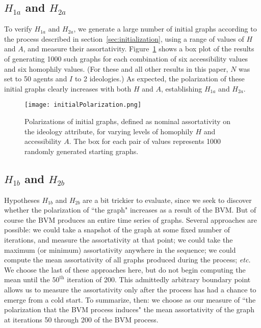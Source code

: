
\subsection{$H_{1a}$ and $H_{2a}$}

To verify $H_{1a}$ and $H_{2a}$, we generate a large number of initial graphs
according to the process described in section~\ref{sec:initialization}, using
a range of values of $H$ and $A$, and measure their assortativity.
Figure~\ref{fig:initialPolarization} shows a box plot of the results of
generating 1000 such graphs for each combination of six accessibility values
and six homophily values. (For these and all other results in this paper, $N$
was set to 50 agents and $I$ to 2 ideologies.) As expected, the polarization
of these initial graphs clearly increases with both $H$ and $A$, establishing
$H_{1a}$ and $H_{2a}$.

\begin{figure}
\centering
\texttt{[image: initialPolarization.png]}
\caption{Polarizations of initial graphs, defined as nominal assortativity on
the ideology attribute, for varying levels of homophily $H$ and accessibility
$A$. The box for each pair of values represents 1000 randomly generated
starting graphs.}
\label{fig:initialPolarization}
\end{figure}

\subsection{$H_{1b}$ and $H_{2b}$}

Hypotheses $H_{1b}$ and $H_{2b}$ are a bit trickier to evaluate, since we seek
to discover whether the polarization of ``the graph" increases as a result
of the BVM. But of course the BVM produces an entire time series of graphs.
Several approaches are possible: we could take a snapshot of the graph at some
fixed number of iterations, and measure the assortativity at that point; we
could take the maximum (or minimum) assortativity anywhere in the sequence; we
could compute the mean assortativity of all graphs produced during the
process; \textit{etc.} We choose the last of these approaches here, but do not
begin computing the mean until the $50^{\text{th}}$ iteration of 200. This
admittedly arbitrary boundary point allows us to measure the assortativity
only after the process has had a chance to emerge from a cold start. To
summarize, then: we choose as our measure of ``the polarization that the BVM
process induces" the mean assortativity of the graph at iterations 50 through
200 of the BVM process.

